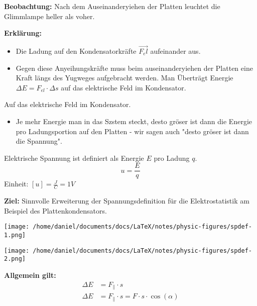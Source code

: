 \documentclass[a4paper]{report}
\begin{document}
\textbf{Beobachtung:} Nach dem Auseinanderyiehen der Platten leuchtet die Glimmlampe heller als voher.

\textbf{Erkl\"arung:} 
\begin{itemize}
  \item Die Ladung auf den Kondensatorkr\"afte $\vec{F_el}$ aufeinander aus.
  \item Gegen diese Anyeihungskr\"afte muss beim auseinanderyiehen der Platten eine Kraft l\"angs des Yugweges aufgebracht werden. Man \"Ubertr\"agt Energie $\Delta E= F_{el}\cdot 
    \Delta s$ auf das elektrische Feld im Kondensator.
\end{itemize}

Auf das elektrische Feld im Kondensator.
\begin{itemize}
  \item Je mehr Energie man in das Szstem steckt, desto gr\"oser ist dann die
    Energie pro Ladungsportion auf den Platten - wir sagen auch "desto gr\"oser
    ist dann die Spannung".
\end{itemize}

\begin{tcolorbox}[colback=red!10!white,colframe=red!75!black]
Elektrische Spannung ist definiert als Energie $E$ pro Ladung $q$.\\
\[u=\frac{E}{q}\]
Einheit: $[u]=\frac{J}{C}=1V$
\end{tcolorbox}

\textbf{Ziel:} Sinnvolle Erweiterung der Spannungsdefinition f\"ur die Elektrostatistik am Beispiel des Plattenkondensators.


\begin{center}
\begin{minipage}[t]{0.45\textwidth}
\centering
\texttt{[image: /home/daniel/documents/docs/LaTeX/notes/physic-figures/spdef-1.png]}
\end{minipage}\hfill

\begin{minipage}[t]{0.45\textwidth}
\centering
\texttt{[image: /home/daniel/documents/docs/LaTeX/notes/physic-figures/spdef-2.png]}
\end{minipage}
\end{center}


\textbf{Allgemein gilt:} 
\begin{align*}
\Delta E&=F_{\parallel} \cdot s \\
\Delta E&=F_{\parallel} \cdot s = F \cdot s \cdot \cos(\alpha)
\end{align*}
\end{document}
